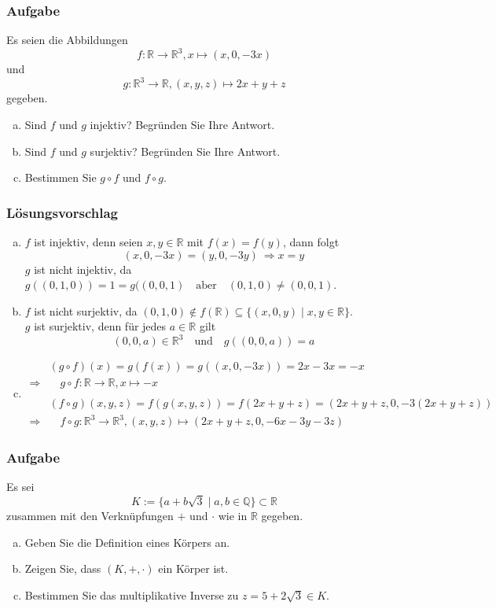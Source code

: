 \documentclass[a4paper,11pt]{scrartcl}
\newcounter{auf}
\newcommand{\Aufgabe}%
        {\addtocounter{auf}{1} \subsubsection*{\rmfamily  Aufgabe \theauf \hspace{1em}} }
\newcommand{\RR}{\mathbb{R}}
\newcommand{\Q}{\mathbb{Q}}
\begin{document}
\newpage
\Aufgabe
Es seien die Abbildungen $$f:\RR \to \RR^3, x \mapsto (x, 0, -3x)$$ und $$g: \RR^3 \to \RR, (x,y,z) \mapsto 2x+y+z$$ gegeben. 
\begin{enumerate}[a)]
\item Sind $f$ und $g$ injektiv? Begründen Sie Ihre Antwort.
\item Sind $f$ und $g$ surjektiv? Begründen Sie Ihre Antwort.
\item Bestimmen Sie $g \circ f$ und $f\circ g$.
\end{enumerate}

\subsubsection*{Lösungsvorschlag}
\begin{enumerate}[a)]

\item $f$ ist injektiv, denn seien $x,y \in \RR$ mit $f(x)=f(y)$, dann folgt
$$
(x,0,-3x)=(y,0,-3y) \ \Rightarrow x=y
$$
$g$ ist nicht injektiv, da $g((0,1,0))=1=g((0,0,1) \quad \text{aber} \quad (0,1,0) \ne (0,0,1)$.
\item $f$ ist nicht surjektiv, da $(0,1,0) \notin f(\RR) \subseteq \{(x,0,y)\mid x,y \in \RR\} $.\\
$g$ ist surjektiv, denn für jedes $a \in \RR$ gilt
$$
(0,0,a) \in \RR^3 \quad \text{und} \quad g((0,0,a))=a
$$
\item
\begin{align*}
&(g\circ f)(x)=g(f(x))=g((x,0,-3x))=2x-3x=-x\\
\Rightarrow&\quad g\circ f :\RR \to \RR, x \mapsto -x\\
&\\
&(f \circ g)(x,y,z)=f(g(x,y,z))=f(2x+y+z)=(2x+y+z,0,-3(2x+y+z))\\
\Rightarrow&\quad f\circ g : \RR^3 \to \RR^3, (x,y,z) \mapsto (2x+y+z,0,-6x-3y-3z)
\end{align*}

\end{enumerate}

\newpage
\Aufgabe
Es sei 
$$K:=\{a+b\sqrt{3} \mid a,b \in  \Q \} \subset \RR$$
zusammen mit den Verknüpfungen $+$ und $\cdot$ wie in $\RR$ gegeben.
\begin{enumerate}[a)]
\item Geben Sie die Definition eines Körpers an.

\item Zeigen Sie, dass $(K,+,\cdot)$ ein Körper ist.

\item Bestimmen Sie das multiplikative Inverse zu $z=5+2\sqrt{3} \in K$. 

\end{enumerate}
\end{document}
